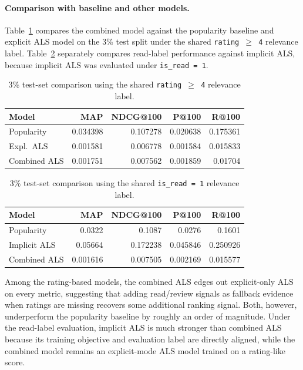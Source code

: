 \documentclass[10pt,twocolumn]{article}
\begin{document}
\paragraph{Comparison with baseline and other models.} Table~\ref{tab:combined-compare} compares the combined model against the popularity baseline and explicit ALS model on the 3\% test split under the shared \texttt{rating $\geq$ 4} relevance label. Table~\ref{tab:combined-read-compare} separately compares read-label performance against implicit ALS, because implicit ALS was evaluated under \texttt{is\_read = 1}.

\begin{table}[!ht]
\centering
\caption{3\% test-set comparison using the shared \texttt{rating $\geq$ 4} relevance label.}
\label{tab:combined-compare}
\footnotesize
\setlength{\tabcolsep}{3pt}
\begin{tabular}{l r r r r}
\toprule
\textbf{Model} & \textbf{MAP} & \textbf{NDCG@100} & \textbf{P@100} & \textbf{R@100} \\
\midrule
Popularity      & 0.034398 & 0.107278 & 0.020638 & 0.175361 \\
Expl.~ALS       & 0.001581 & 0.006778 & 0.001584 & 0.015833 \\
Combined ALS    & 0.001751 & 0.007562 & 0.001859 & 0.01704 \\
\bottomrule
\end{tabular}
\end{table}

\begin{table}[!ht]
\centering
\caption{3\% test-set comparison using the shared \texttt{is\_read = 1} relevance label.}
\label{tab:combined-read-compare}
\footnotesize
\setlength{\tabcolsep}{3pt}
\begin{tabular}{l r r r r}
\toprule
\textbf{Model} & \textbf{MAP} & \textbf{NDCG@100} & \textbf{P@100} & \textbf{R@100} \\
\midrule
Popularity   & 0.0322 & 0.1087 & 0.0276 & 0.1601 \\
Implicit ALS & 0.05664 & 0.172238 & 0.045846 & 0.250926 \\
Combined ALS & 0.001616 & 0.007505 & 0.002169 & 0.015577 \\
\bottomrule
\end{tabular}
\end{table}

Among the rating-based models, the combined ALS edges out explicit-only ALS on every metric, suggesting that adding read/review signals as fallback evidence when ratings are missing recovers some additional ranking signal. Both, however, underperform the popularity baseline by roughly an order of magnitude. Under the read-label evaluation, implicit ALS is much stronger than combined ALS because its training objective and evaluation label are directly aligned, while the combined model remains an explicit-mode ALS model trained on a rating-like score.
\end{document}
